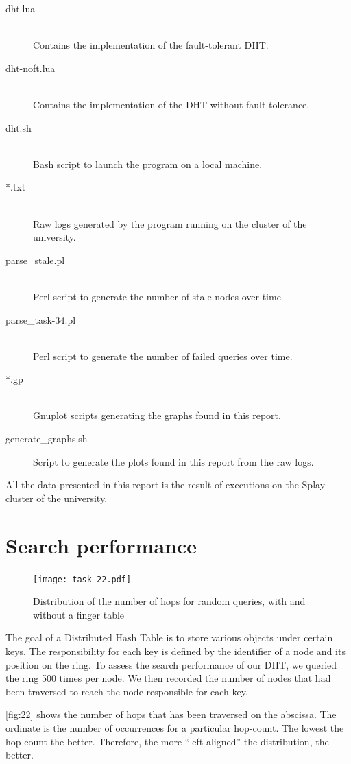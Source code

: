 \documentclass[11pt,a4paper]{scrartcl}
\begin{document}
\begin{description}
\item[dht.lua]\hfill\\ Contains the implementation of the fault-tolerant DHT.
\item[dht-noft.lua]\hfill\\ Contains the implementation of the DHT without fault-tolerance.
\item[dht.sh]\hfill\\ Bash script to launch the program on a local machine.
\item[*.txt]\hfill\\ Raw logs generated by the program running on the cluster of the university.
\item[parse\_stale.pl]\hfill\\ Perl script to generate the number of stale nodes over time.
\item[parse\_task-34.pl]\hfill\\ Perl script to generate the number of failed queries over time.
\item[*.gp]\hfill\\ Gnuplot scripts generating the graphs found in this report.
\item[generate\_graphs.sh] Script to generate the plots found in this report from the raw logs.
\end{description}

All the data presented in this report is the result of executions on the Splay cluster of the university.

\section{Search performance}

\begin{figure}
	\centering
	\texttt{[image: task-22.pdf]}
	\caption{Distribution of the number of hops for random queries, with and without a finger table}
	\label{fig:22}
\end{figure}

The goal of a Distributed Hash Table is to store various objects under certain keys.
The responsibility for each key is defined by the identifier of a node and its position on the ring.
To assess the search performance of our DHT, we queried the ring 500 times per node.
We then recorded the number of nodes that had been traversed to reach the node responsible for each key.

\autoref{fig:22} shows the number of hops that has been traversed on the abscissa.
The ordinate is the number of occurrences for a particular hop-count.
The lowest the hop-count the better.
Therefore, the more \enquote{left-aligned} the distribution, the better.
\end{document}
